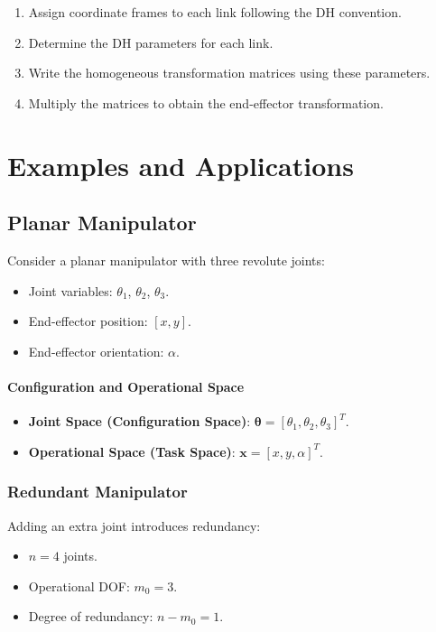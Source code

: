 \documentclass{article}
\begin{document}
\begin{enumerate}
    \item Assign coordinate frames to each link following the DH convention.
    \item Determine the DH parameters for each link.
    \item Write the homogeneous transformation matrices using these parameters.
    \item Multiply the matrices to obtain the end-effector transformation.
\end{enumerate}

\section{Examples and Applications}

\subsection{Planar Manipulator}

Consider a planar manipulator with three revolute joints:

\begin{itemize}
    \item Joint variables: $\theta_1$, $\theta_2$, $\theta_3$.
    \item End-effector position: $[x, y]$.
    \item End-effector orientation: $\alpha$.
\end{itemize}

\paragraph{Configuration and Operational Space}

\begin{itemize}
    \item \textbf{Joint Space (Configuration Space)}: $\bm{\theta} = [\theta_1, \theta_2, \theta_3]^T$.
    \item \textbf{Operational Space (Task Space)}: $\mathbf{x} = [x, y, \alpha]^T$.
\end{itemize}

\subsubsection{Redundant Manipulator}

Adding an extra joint introduces redundancy:

\begin{itemize}
    \item $n = 4$ joints.
    \item Operational DOF: $m_0 = 3$.
    \item Degree of redundancy: $n - m_0 = 1$.
\end{itemize}
\end{document}
